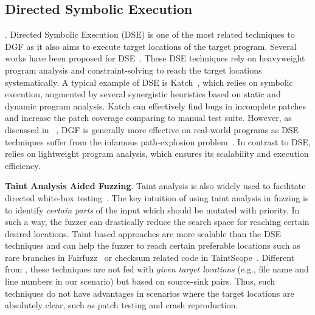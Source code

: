 \subsection{Directed Symbolic Execution}.
Directed Symbolic Execution (DSE) is one of the most related techniques to DGF as it also aims to execute target locations of the target program.
Several works have been proposed for DSE~\cite{Godefroid:2005:DART, Ma:2011:DSE:2041552.2041563, Haller:2013:DOG, Jin:2012, Marinescu:2013:katch}.
These DSE techniques rely on heavyweight program analysis and  constraint-solving to reach the target locations systematically.
A typical example of DSE is Katch~\cite{Marinescu:2013:katch}, which relies on symbolic execution, augmented by several synergistic heuristics based on static and dynamic program analysis.
Katch can effectively find bugs in incomplete patches and increase the patch coverage comparing to manual test suite.
However, as discussed in ~\cite{Bohme:2017:DGF}, DGF is generally more effective on real-world programs as DSE techniques suffer from the infamous path-explosion problem~\cite{Stephens2016Driller}.
In contrast to DSE, \dFOT relies on  lightweight program analysis, which ensures its scalability and execution efficiency.

\noindent\textbf{Taint Analysis Aided Fuzzing}.
Taint analysis is also widely used to facilitate directed white-box testing~\cite{Ganesh:2009:TDW, rawat:2017, wangwgz:2010, Angora,FairFuzz}.
The key intuition of using taint analysis in fuzzing is to identify \emph{certain parts} of the input which should be mutated with priority.
In such a way, the fuzzer can drastically reduce the search space for reaching certain desired locations.
Taint based approaches are more scalable than the DSE techniques and can help the fuzzer to reach certain preferable locations such as rare branches in Fairfuzz~\cite{FairFuzz} or checksum related code in TaintScope~\cite{wangwgz:2010}.
Different from \dFOT, these techniques are not fed with \emph{given target locations} (e.g., file name and line numbers in our scenario) but based on source-sink pairs.
Thus, such techniques do not have advantages in scenarios where the target locations are absolutely clear, such as patch testing and crash reproduction. 


